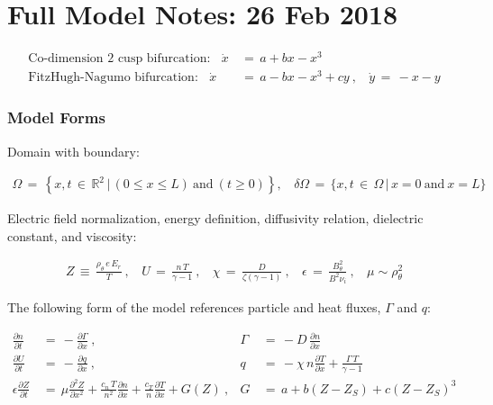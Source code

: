 \documentclass[a4paper,8pt]{article}
\date{}
\begin{document}
\section{Full Model Notes: 26 Feb
2018}\label{full-model-notes-26-feb-2018}

\small

\begin{align}
    \text{Co-dimension 2 cusp bifurcation:} ~~~~ \dot{x} \,&=\, a + bx - x^3 \\
    \text{FitzHugh-Nagumo bifurcation:} ~~~~ \dot{x} \,&=\, a - bx - x^3 + cy~, ~~~~ \dot{y} \,=\, -x - y
\end{align}

\normalsize

\subsubsection{Model Forms}\label{model-forms}

Domain with boundary: \small

\begin{align}
    \Omega \,=\, \left\{x, t \,\in\, \mathbb{R}^2 \,|\, (0 \leq x \leq L) ~\text{and}~ (t \geq 0)\right\}, ~~~~ \delta\Omega \,=\, \{x, t \,\in\, \Omega \,|\, x = 0 ~\text{and}~ x = L \}
\end{align}

\normalsize

Electric field normalization, energy definition, diffusivity relation,
dielectric constant, and viscosity: \small

\begin{align}
    Z \,\equiv\, \frac{\rho_\theta \, e \, E_r}{T}~, ~~~~ U \,=\, \frac{n\,T}{\gamma - 1}~, ~~~~ \chi \,=\, \frac{D}{\zeta(\gamma - 1)}~, ~~~~ \epsilon \,=\, \frac{B_\theta^2}{B^2 \nu_i}~, ~~~~ \mu \sim \rho_\theta^2
\end{align}

\normalsize

The following form of the model references particle and heat fluxes,
\(\Gamma\) and \(q\): \small

\begin{align}
    \frac{\partial n}{\partial t} \,&=\, -\frac{\partial \Gamma}{\partial x}~, &\Gamma \,&=\, -D \, \frac{\partial n}{\partial x} \\
    \frac{\partial U}{\partial t} \,&=\, -\frac{\partial q}{\partial x}~, &q \,&=\, -\chi \, n \frac{\partial T}{\partial x} + \frac{\Gamma\,T}{\gamma - 1} \\
    \epsilon \frac{\partial Z}{\partial t} \,&=\, \mu \frac{\partial^2 Z}{\partial x^2} + \frac{c_n \, T}{n^2} \frac{\partial n}{\partial x} + \frac{c_T}{n} \frac{\partial T}{\partial x} + G(Z)~, &G \,&=\, a + b(Z - Z_S) + c(Z - Z_S)^3
\end{align}
\end{document}
